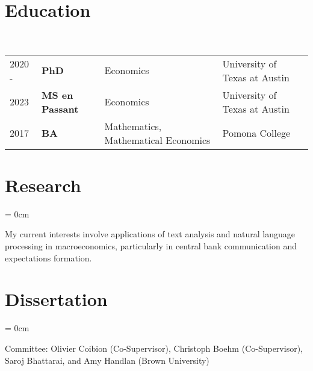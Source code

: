 \documentclass[a4paper, 10pt]{article}
\begin{document}
  \maketitle
  \thispagestyle{firststyle}
  \section{Education}
  ~\begin{tabular}{llll}
    2020 - & \textbf{PhD} & Economics & University of Texas at Austin\\
    2023 & \textbf{MS en Passant} & Economics & University of Texas at Austin\\
    2017 & \textbf{BA} & Mathematics, Mathematical Economics & Pomona College
  \end{tabular}
  \vspace*{0.25em}

  \section{Research}
  \begin{compactitem}\parskip = 0cm
    \item My current interests involve applications of text analysis and natural language processing in macroeconomics, particularly in central bank communication and expectations formation.
  \end{compactitem}
  \vspace*{0.25em}

  \section{Dissertation}
  \begin{compactitem}\parskip = 0cm
    \item Committee: Olivier Coibion (Co-Supervisor), Christoph Boehm (Co-Supervisor), Saroj Bhattarai, and Amy Handlan (Brown University)
  \end{compactitem}
  \vspace*{0.25em}

  \begin{publications}
  \end{publications}
  \vspace*{-0.75em}
\end{document}
